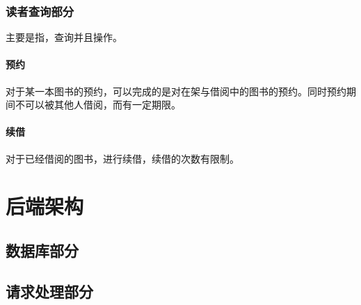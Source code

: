 \documentclass[UTF8]{ctexrep}
\begin{document}
    \section{读者查询部分}
    主要是指，查询并且操作。
    \subsection{预约}
    对于某一本图书的预约，可以完成的是对在架与借阅中的图书的预约。同时预约期间不可以被其他人借阅，而有一定期限。
    \subsection{续借}
    对于已经借阅的图书，进行续借，续借的次数有限制。
    \part{后端架构}
    \setcounter{chapter}{0}
    \chapter{数据库部分}
    \chapter{请求处理部分}
    
\end{document}
